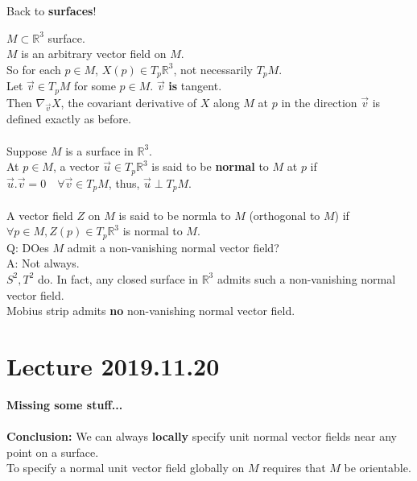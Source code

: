 \documentclass{article}
\newcommand{\R}{\mathbb{R}}
\theoremstyle{definition}
\theoremstyle{remark}
\theoremstyle{example}
\begin{document}
	Back to \textbf{surfaces}!
	
	$M \subset \R^3$ surface.\\
	$M$ is an arbitrary vector field on $M$.\\
	So for each $p \in M$, $X(p) \in T_p \R^3$, not necessarily $T_pM$.\\
	Let $\vec{v} \in T_pM$ for some $p \in M$. $\vec{v}$ \textbf{is} tangent.\\
	Then $\nabla_{\vec{v}}X$, the covariant derivative of $X$ along $M$ at $p$ in the direction $\vec{v}$ is defined exactly as before.\\
	\\
	Suppose $M$ is a surface in $\R^3$.\\
	At $p \in M$, a vector $\vec{u} \in T_p \R^3 $ is said to be \textbf{normal} to $M$ at $p$ if $\vec{u}.\vec{v}=0 \quad \forall \vec{v} \in T_pM$, thus, $\vec{u} \perp T_pM$.\\
	\\
	A vector field $Z$ on $M$ is said to be normla to $M$ (orthogonal to $M$) if $\forall p \in M, Z(p) \in T_p \R^3$ is normal to $M$.	\\
	Q: DOes $M$ admit a non-vanishing normal vector field?\\
	A: Not always.\\
	$S^2, T^2$ do. In fact, any closed surface in $\R^3$ admits such a non-vanishing normal vector field.\\
	Mobius strip admits \textbf{no} non-vanishing normal vector field.
	
%	
	
	\section*{Lecture 2019.11.20}
	\textbf{Missing some stuff...}\\\\
	\textbf{Conclusion: }We can always \textbf{locally} specify unit normal vector fields near any point on a surface.\\
	To specify a normal unit vector field globally on $M$ requires that $M$ be orientable.
	
\end{document}

